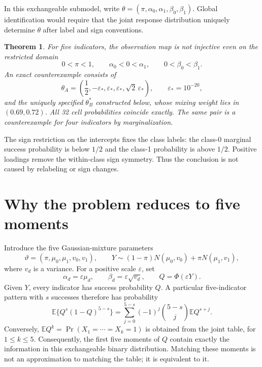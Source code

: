 \documentclass[11pt,a4paper]{article}
\numberwithin{equation}{section}
\newtheorem{theorem}{Theorem}
\newcommand{\E}{\mathbb E}
\newcommand{\vt}{\vartheta}
\begin{document}
In this exchangeable submodel, write $\theta=(\pi,\alpha_0,\alpha_1,\beta_0,\beta_1)$. Global identification would require that the joint response distribution uniquely determine $\theta$ after label and sign conventions.

\begin{theorem}\label{thm:main}
For five indicators, the observation map is not injective even on the restricted domain
\begin{equation}\label{eq:restrictions}
 0<\pi<1,\qquad \alpha_0<0<\alpha_1,\qquad 0<\beta_0<\beta_1.
\end{equation}
An exact counterexample consists of
\begin{equation}\label{eq:thetaA}
 \theta_A=\left(\frac12,-\varepsilon_*,\varepsilon_*,
                  \varepsilon_*,\sqrt2\,\varepsilon_*\right),
 \qquad \varepsilon_*=10^{-20},
\end{equation}
and the uniquely specified $\theta_B^*$ constructed below, whose mixing weight lies in $(0.69,0.72)$. All 32 cell probabilities coincide exactly. The same pair is a counterexample for four indicators by marginalization.
\end{theorem}

The sign restriction on the intercepts fixes the class labels: the class-0 marginal success probability is below $1/2$ and the class-1 probability is above $1/2$. Positive loadings remove the within-class sign symmetry. Thus the conclusion is not caused by relabeling or sign changes.

\section{Why the problem reduces to five moments}
Introduce the five Gaussian-mixture parameters
\begin{equation}\label{eq:Gaussian}
 \vt=(\pi,\mu_0,\mu_1,v_0,v_1),\qquad
 Y\sim(1-\pi)N(\mu_0,v_0)+\pi N(\mu_1,v_1),
\end{equation}
where $v_d$ is a variance. For a positive scale $\varepsilon$, set
\begin{equation}\label{eq:map}
 \alpha_d=\varepsilon\mu_d,\qquad
 \beta_d=\varepsilon\sqrt{v_d},\qquad Q=\Phi(\varepsilon Y).
\end{equation}
Given $Y$, every indicator has success probability $Q$. A particular five-indicator pattern with $s$ successes therefore has probability
\begin{equation}\label{eq:pattern}
 \E\{Q^s(1-Q)^{5-s}\}
 =\sum_{j=0}^{5-s}(-1)^j\binom{5-s}{j}\E Q^{s+j}.
\end{equation}
Conversely, $\E Q^k=\Pr(X_1=\cdots=X_k=1)$ is obtained from the joint table, for $1\le k\le5$. Consequently, the first five moments of $Q$ contain exactly the information in this exchangeable binary distribution. Matching these moments is not an approximation to matching the table; it is equivalent to it.
\end{document}
